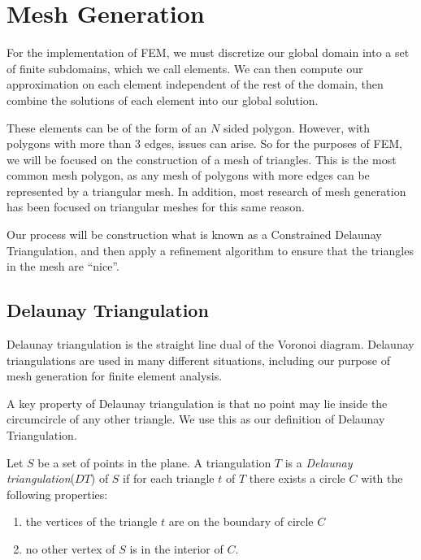 \documentclass[../fem.tex]{subfiles}
\begin{document}
\section{Mesh Generation}%
\label{sec:mesh_generation}

For the implementation of FEM, we must discretize our global domain into a set
of finite subdomains, which we call elements. We can then compute our
approximation on each element independent of the rest of the domain, then
combine the solutions of each element into our global solution.

These elements can be of the form of an $N$ sided polygon. However, with
polygons with more than $3$ edges, issues can arise. So for the purposes of
FEM, we will be focused on the construction of a mesh of triangles. This is the
most common mesh polygon, as any mesh of polygons with more edges can be
represented by a triangular mesh. In addition, most research of mesh generation
has been focused on triangular meshes for this same reason.

Our process will be construction what is known as a Constrained Delaunay
Triangulation, and then apply a refinement algorithm to ensure that the
triangles in the mesh are ``nice''.

\subsection{Delaunay Triangulation}%
\label{sub:delaunay_triangulation}

Delaunay triangulation is the straight line dual of the Voronoi diagram.
Delaunay triangulations are used in many different situations, including our
purpose of mesh generation for finite element analysis.


A key property of Delaunay triangulation is that no point may lie inside the
circumcircle of any other triangle. We use this as our definition of Delaunay
Triangulation.

\begin{definition} \label{def:dt}
  Let $S$ be a set of points in the plane. A triangulation $T$ is
  a \textit{Delaunay triangulation}($DT$) of $S$ if for each triangle $t$ of $T$
  there exists a circle $C$ with the following properties:
  \begin{enumerate}
    \item the vertices of the triangle $t$ are on the boundary of circle $C$
    \item no other vertex of $S$ is in the interior of $C$.
  \end{enumerate}
\end{definition}
\end{document}
